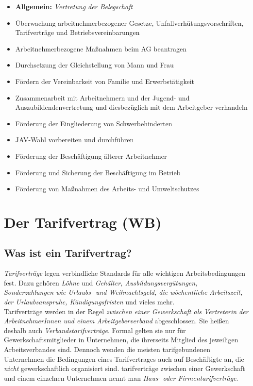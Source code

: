 \documentclass[a4paper, 12pt]{report}
\begin{document}
\begin{itemize}
    \item \textbf{Allgemein:} \emph{Vertretung der Belegschaft}
    \item Überwachung arbeitnehmerbezogener Gesetze, 
        Unfallverhütungsvorschriften, Tarifverträge und Betriebsvereinbarungen
    \item Arbeitnehmerbezogene Maßnahmen beim AG beantragen
    \item Durchsetzung der Gleichstellung von Mann und Frau
    \item Fördern der Vereinbarkeit von Familie und Erwerbstätigkeit 
    \item Zusammenarbeit mit Arbeitnehmern und der Jugend- und 
        Auszubildendenvertretung und diesbezüglich mit dem Arbeitgeber 
        verhandeln
    \item Förderung der Eingliederung von Schwerbehinderten
    \item JAV-Wahl vorbereiten und durchführen
    \item Förderung der Beschäftigung älterer Arbeitnehmer
    \item Förderung und Sicherung der Beschäftigung im Betrieb
    \item Förderung von Maßnahmen des Arbeits- und Umweltschutzes
\end{itemize}

\section{Der Tarifvertrag (WB)}

\subsection{Was ist ein Tarifvertrag?}

\emph{Tarifverträge} legen verbindliche Standards für alle wichtigen 
Arbeitsbedingungen fest. Dazu gehören \emph{Löhne} und \emph{Gehälter, 
Ausbildungsvergütungen, Sonderzahlungen wie Urlaubs- und Weihnachtsgeld, die 
wöchentliche Arbeitszeit, der Urlaubsanspruhc, Kündigungsfristen} und vieles 
mehr. \\

Tarifverträge werden in der Regel \emph{zwischen einer Gewerkschaft als 
Vertreterin der ArbeitnehmerInnen und einem Arbeitgeberverband} abgeschlossen. 
Sie heißen deshalb auch \emph{Verbandstarifverträge}. Formal gelten sie nur für 
Gewerkschaftsmitglieder in Unternehmen, die ihrerseits Mitglied des jeweiligen 
Arbeitsverbandes sind. Dennoch wenden die meisten tarifgebundenen Unternehmen
die Bedingungen eines Tarifvertrages auch auf Beschäftigte an, die \emph{nicht} 
gewerkschaftlich organisiert sind. tarifverträge zwischen einer Gewerkschaft und 
einem einzelnen Unternehmen nennt man \emph{Haus- oder Firmentarifverträge}. \\
\end{document}
